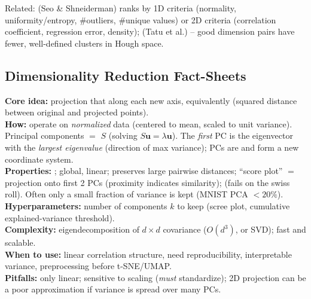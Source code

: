 \noindent Related:  (Seo \& Shneiderman) ranks by 1D
criteria (normality, uniformity/entropy, \#outliers, \#unique values) or 2D
criteria (correlation coefficient, regression error, density);
 (Tatu et al.) -- good dimension pairs
have fewer, well-defined clusters in Hough space.

\subsection{Dimensionality Reduction Fact-Sheets}

\begin{algobox}
\textbf{Core idea:}  projection that  along
each new axis, equivalently  (squared distance between original and projected points).\\
\textbf{How:} operate on \emph{normalized} data (centered to mean, scaled to unit
variance). Principal components $=$ 
$S$ (solving $S\mathbf{u}=\lambda\mathbf{u}$). The \emph{first} PC is the
eigenvector with the \emph{largest eigenvalue} (direction of max variance); PCs
are  and form a new coordinate system.\\
\textbf{Properties:} ; global, linear; preserves large
pairwise distances; ``score plot'' $=$ projection onto first 2 PCs (proximity
indicates similarity);  (fails on the
swiss roll). Often only a small fraction of variance is kept (MNIST PCA $<20\%$).\\
\textbf{Hyperparameters:} number of components $k$ to keep (scree plot,
cumulative explained-variance threshold).\\
\textbf{Complexity:} eigendecomposition of $d\times d$ covariance
($O(d^3)$, or SVD); fast and scalable.\\
\textbf{When to use:} linear correlation structure, need reproducibility,
interpretable variance, preprocessing before t-SNE/UMAP.\\
\textbf{Pitfalls:} only linear; sensitive to scaling (\emph{must} standardize);
2D projection can be a poor approximation if variance is spread over many PCs.
\end{algobox}

